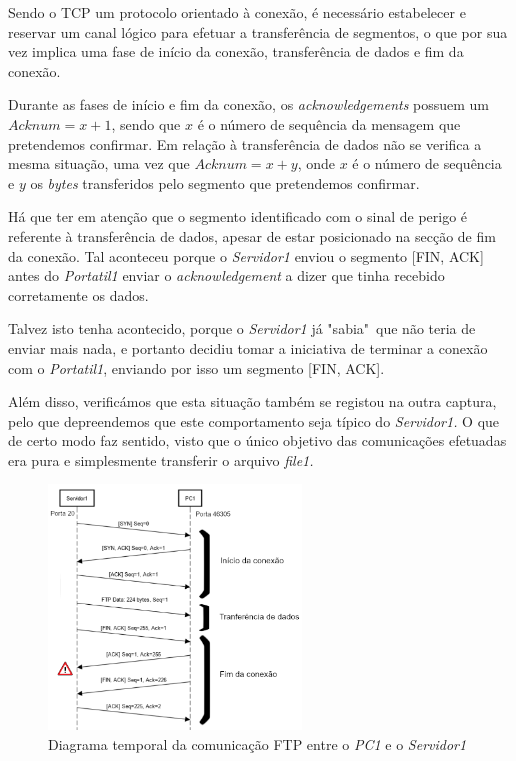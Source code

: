         Sendo o TCP um protocolo orientado à conexão, é necessário estabelecer e reservar um canal lógico para efetuar a transferência de segmentos, o que por sua vez implica uma fase de início da conexão, transferência de dados e fim da conexão.

        Durante as fases de início e fim da conexão, os \textit{acknowledgements} possuem um $Acknum = x+1$, sendo que $x$ é o número de sequência da mensagem que pretendemos confirmar. Em relação à transferência de dados não se verifica a mesma situação, uma vez que $Acknum = x + y$, onde $x$ é o número de sequência e $y$ os \textit{bytes} transferidos pelo segmento que pretendemos confirmar.

        Há que ter em atenção que o segmento identificado com o sinal de perigo é referente à transferência de dados, apesar de estar posicionado na secção de fim da conexão. Tal aconteceu porque o \textit{Servidor1} enviou o segmento [FIN, ACK] antes do \textit{Portatil1} enviar o \textit{acknowledgement} a dizer que tinha recebido corretamente os dados.
        
        Talvez isto tenha acontecido, porque o \textit{Servidor1} já "sabia"~que não teria de enviar mais nada, e portanto decidiu tomar a iniciativa de terminar a conexão com o \textit{Portatil1}, enviando por isso um segmento [FIN, ACK].

        Além disso, verificámos que esta situação também se registou na outra captura, pelo que depreendemos que este comportamento seja típico do \textit{Servidor1.} O que de certo modo faz sentido, visto que o único objetivo das comunicações efetuadas era pura e simplesmente transferir o arquivo \textit{file1.}

        \newpage
        \begin{figure}[hb!]
            \centering
            \includegraphics[width=0.6\textwidth]{Imagens/6.png}
            \caption{Diagrama temporal da comunicação FTP entre o \textit{PC1} e o \textit{Servidor1}}
            \vspace{-10pt}
        \end{figure}

